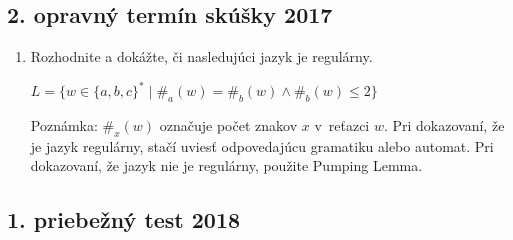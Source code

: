 \documentclass[11pt,a4paper]{article}
\begin{document}
		\subsection{2. opravný termín skúšky 2017}

		\begin{enumerate}
			\item Rozhodnite a dokážte, či nasledujúci jazyk je regulárny.

			$L = \{w \in \{a,b,c\}^* \mid \#_a(w) = \#_b(w) \land \#_b(w) \leq 2\}$
	
			Poznámka: $\#_x(w)$ označuje počet znakov $x$ v~reťazci $w$. Pri dokazovaní, že je jazyk regulárny, stačí uviesť odpovedajúcu gramatiku alebo automat. Pri dokazovaní, že jazyk nie je regulárny, použite Pumping Lemma.
		\end{enumerate}
		
		\subsection{1. priebežný test 2018}
		
\end{document}
